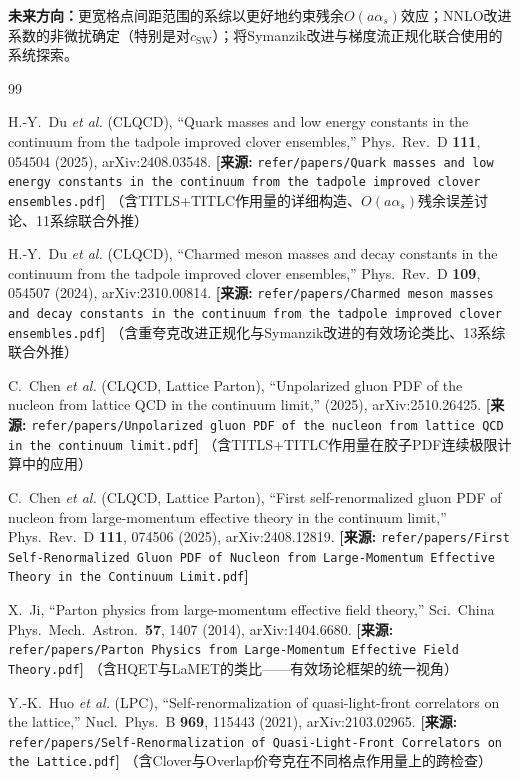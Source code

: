 \documentclass[12pt,a4paper]{ctexart}
\theoremstyle{definition}
\begin{document}
\textbf{未来方向：}更宽格点间距范围的系综以更好地约束残余$O(a\alpha_s)$效应；NNLO改进系数的非微扰确定（特别是对$c_{\text{SW}}$）；将Symanzik改进与梯度流正规化联合使用的系统探索。

\begin{thebibliography}{99}

H.-Y.~Du \textit{et al.} (CLQCD),
``Quark masses and low energy constants in the continuum from the tadpole improved clover ensembles,''
Phys.\ Rev.\ D \textbf{111}, 054504 (2025), arXiv:2408.03548.
\quad\textbf{[来源:} \texttt{refer/papers/Quark masses and low energy constants in the continuum from the tadpole improved clover ensembles.pdf}\textbf{]}
（含TITLS+TITLC作用量的详细构造、$O(a\alpha_s)$残余误差讨论、11系综联合外推）

H.-Y.~Du \textit{et al.} (CLQCD),
``Charmed meson masses and decay constants in the continuum from the tadpole improved clover ensembles,''
Phys.\ Rev.\ D \textbf{109}, 054507 (2024), arXiv:2310.00814.
\quad\textbf{[来源:} \texttt{refer/papers/Charmed meson masses and decay constants in the continuum from the tadpole improved clover ensembles.pdf}\textbf{]}
（含重夸克改进正规化与Symanzik改进的有效场论类比、13系综联合外推）

C.~Chen \textit{et al.} (CLQCD, Lattice Parton),
``Unpolarized gluon PDF of the nucleon from lattice QCD in the continuum limit,''
(2025), arXiv:2510.26425.
\quad\textbf{[来源:} \texttt{refer/papers/Unpolarized gluon PDF of the nucleon from lattice QCD in the continuum limit.pdf}\textbf{]}
（含TITLS+TITLC作用量在胶子PDF连续极限计算中的应用）

C.~Chen \textit{et al.} (CLQCD, Lattice Parton),
``First self-renormalized gluon PDF of nucleon from large-momentum effective theory in the continuum limit,''
Phys.\ Rev.\ D \textbf{111}, 074506 (2025), arXiv:2408.12819.
\quad\textbf{[来源:} \texttt{refer/papers/First Self-Renormalized Gluon PDF of Nucleon from Large-Momentum Effective Theory in the Continuum Limit.pdf}\textbf{]}

X.~Ji,
``Parton physics from large-momentum effective field theory,''
Sci.\ China Phys.\ Mech.\ Astron.\ \textbf{57}, 1407 (2014), arXiv:1404.6680.
\quad\textbf{[来源:} \texttt{refer/papers/Parton Physics from Large-Momentum Effective Field Theory.pdf}\textbf{]}
（含HQET与LaMET的类比——有效场论框架的统一视角）

Y.-K.~Huo \textit{et al.} (LPC),
``Self-renormalization of quasi-light-front correlators on the lattice,''
Nucl.\ Phys.\ B \textbf{969}, 115443 (2021), arXiv:2103.02965.
\quad\textbf{[来源:} \texttt{refer/papers/Self-Renormalization of Quasi-Light-Front Correlators on the Lattice.pdf}\textbf{]}
（含Clover与Overlap价夸克在不同格点作用量上的跨检查）


\end{thebibliography}
\end{document}
